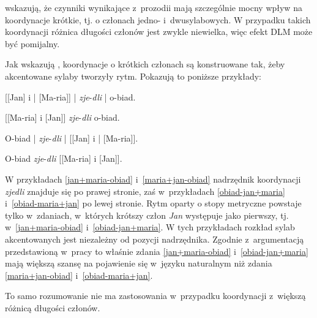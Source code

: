 \cite{wright2005ladies} wskazują, że czynniki wynikające z~prozodii mają szczególnie mocny wpływ na koordynacje krótkie, tj. o członach jedno- i~dwusylabowych. W przypadku takich koordynacji różnica długości członów jest zwykle niewielka, więc efekt DLM może być pomijalny.

Jak wskazują \cite{mcdonald1993word}, koordynacje o krótkich członach są konstruowane tak, żeby akcentowane sylaby tworzyły rytm. Pokazują to poniższe przykłady:

\begin{exe}
\ex \label{jan+maria-obiad} {
        {[[Jan] i | [Ma-ria]] |  \textit{zje}-\textit{dli} | o-biad.}
        }
        
\ex \label{maria+jan-obiad} {
        {[[Ma-ria] i [Jan]] \textit{zje}-\textit{dli} o-biad.}
        }
        
\ex \label{obiad-jan+maria} {
        {O-biad | \textit{zje}-\textit{dli} | [[Jan] i | [Ma-ria]].}
        }

\ex \label{obiad-maria+jan} {
        {O-biad \textit{zje}-\textit{dli} [[Ma-ria] i [Jan]].}
        }
\end{exe}
        
W przykładach \eqref{jan+maria-obiad} i~\eqref{maria+jan-obiad} nadrzędnik koordynacji \textit{zjedli} znajduje się po prawej stronie, zaś w~przykładach \eqref{obiad-jan+maria} i~\eqref{obiad-maria+jan} po lewej stronie. Rytm oparty o stopy metryczne powstaje tylko w~zdaniach, w~których krótszy człon \textit{Jan} występuje jako pierwszy, tj. w~\eqref{jan+maria-obiad} i~\eqref{obiad-jan+maria}. W tych przykładach rozkład sylab akcentowanych jest niezależny od pozycji nadrzędnika. Zgodnie z~argumentacją przedstawioną w~pracy \cite{mcdonald1993word} to właśnie zdania \eqref{jan+maria-obiad} i~\eqref{obiad-jan+maria} mają większą szansę na pojawienie się w~języku naturalnym niż zdania \eqref{maria+jan-obiad} i~\eqref{obiad-maria+jan}.

To samo rozumowanie nie ma zastosowania w~przypadku koordynacji z~większą różnicą długości członów.

